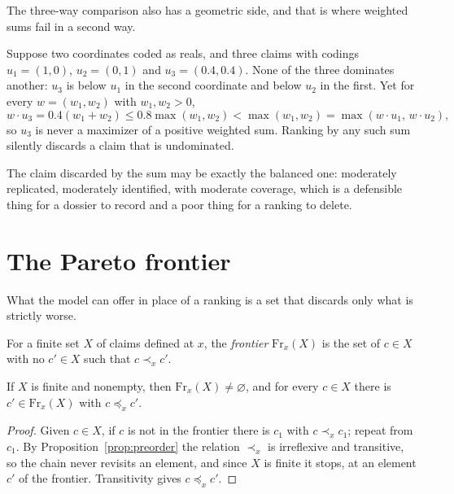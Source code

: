 The three-way comparison also has a geometric side, and that is where weighted sums fail in a second way.

\begin{counterexample}\label{cex:nonconvex}
Suppose two coordinates coded as reals, and three claims with codings $u_1=(1,0)$, $u_2=(0,1)$ and $u_3=(0.4,0.4)$. None of the three dominates another: $u_3$ is below $u_1$ in the second coordinate and below $u_2$ in the first. Yet for every $w=(w_1,w_2)$ with $w_1,w_2>0$,
\[
w\cdot u_3=0.4(w_1+w_2)\le 0.8\max(w_1,w_2)<\max(w_1,w_2)=\max(w\cdot u_1,\,w\cdot u_2),
\]
so $u_3$ is never a maximizer of a positive weighted sum. Ranking by any such sum silently discards a claim that is undominated.
\end{counterexample}

The claim discarded by the sum may be exactly the balanced one: moderately replicated, moderately identified, with moderate coverage, which is a defensible thing for a dossier to record and a poor thing for a ranking to delete.

\section{The Pareto frontier}\label{sec:pareto}

What the model can offer in place of a ranking is a set that discards only what is strictly worse.

\begin{definition}[Frontier]\label{def:frontier}
For a finite set $X$ of claims defined at $x$, the \emph{frontier} $\mathrm{Fr}_x(X)$ is the set of $c\in X$ with no $c'\in X$ such that $c\prec_x c'$.
\end{definition}

\begin{proposition}\label{prop:pareto}
If $X$ is finite and nonempty, then $\mathrm{Fr}_x(X)\ne\varnothing$, and for every $c\in X$ there is $c'\in\mathrm{Fr}_x(X)$ with $c\preceq_x c'$.
\end{proposition}

\begin{proof}
Given $c\in X$, if $c$ is not in the frontier there is $c_1$ with $c\prec_x c_1$; repeat from $c_1$. By Proposition~\ref{prop:preorder} the relation $\prec_x$ is irreflexive and transitive, so the chain never revisits an element, and since $X$ is finite it stops, at an element $c'$ of the frontier. Transitivity gives $c\preceq_x c'$.
\end{proof}

